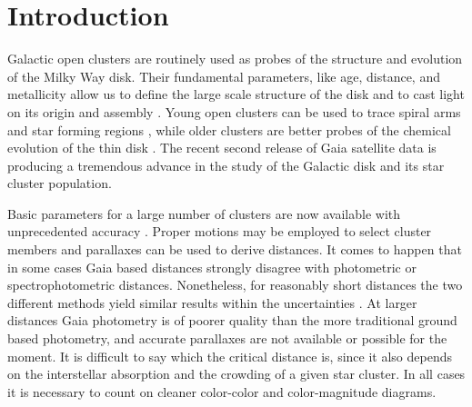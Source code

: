 \documentclass[draft]{aa}
\begin{document}
\maketitle




\section{Introduction}

Galactic open clusters are routinely used as probes of the structure and
evolution of the Milky Way disk. Their fundamental parameters, like age,
distance, and metallicity allow us to define the large scale structure of the
disk and to cast light on its origin and assembly \citep{Janes_1982,
Moitinho_2010,2018A&A...618A..93C}. Young open clusters can be used to trace
spiral arms and star forming regions \citep{Moitinho_2006,Vazquez2008}, while
older clusters are better probes of the chemical evolution of the thin disk
\citep{2009yCat..35120063M}. The recent second release of Gaia satellite data
\citep{GaiaDR2_2018} is producing a tremendous advance in the study of the
Galactic disk and its star cluster population.

Basic parameters for a large number of clusters are now available with
unprecedented accuracy \citep{2018A&A...618A..93C,Soubiran_2018,Bossini_2019}.
Proper motions may be employed to select cluster members and parallaxes can be
used to derive distances. It comes to happen that in some cases Gaia based
distances strongly disagree with photometric or spectrophotometric distances.
Nonetheless, for reasonably short distances the two different methods yield
similar results within the uncertainties \citep{2018A&A...618A..93C}.
At larger distances Gaia
photometry is of poorer quality than the more traditional ground based
photometry, and accurate parallaxes are not available or possible for the
moment. It is difficult to say which the critical distance is, since it also
depends on the interstellar absorption and the crowding of a given star cluster.
In all cases it is necessary to count on cleaner color-color and color-magnitude
diagrams.
\end{document}
